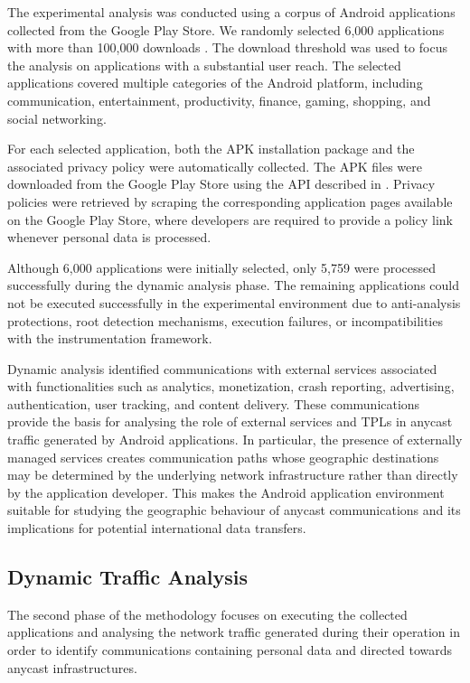 The experimental analysis was conducted using a corpus of Android applications collected from the Google Play Store. We randomly selected 6,000 applications with more than 100,000 downloads \cite{Pascual2025AnycastDisaster}. The download threshold was used to focus the analysis on applications with a substantial user reach. The selected applications covered multiple categories of the Android platform, including communication, entertainment, productivity, finance, gaming, shopping, and social networking.

For each selected application, both the APK installation package and the associated privacy policy were automatically collected. The APK files were downloaded from the Google Play Store using the API described in \cite{Marty0678/googleplay-api:API}. Privacy policies were retrieved by scraping the corresponding application pages available on the Google Play Store, where developers are required to provide a policy link whenever personal data is processed.

Although 6,000 applications were initially selected, only 5,759 were processed successfully during the dynamic analysis phase. The remaining applications could not be executed successfully in the experimental environment due to anti-analysis protections, root detection mechanisms, execution failures, or incompatibilities with the instrumentation framework.

Dynamic analysis identified communications with external services associated with functionalities such as analytics, monetization, crash reporting, advertising, authentication, user tracking, and content delivery. These communications provide the basis for analysing the role of external services and TPLs in anycast traffic generated by Android applications. In particular, the presence of externally managed services creates communication paths whose geographic destinations may be determined by the underlying network infrastructure rather than directly by the application developer. This makes the Android application environment suitable for studying the geographic behaviour of anycast communications and its implications for potential international data transfers.

\subsection{Dynamic Traffic Analysis}
\label{sc:anycast_experiments_traffic_collection}

The second phase of the methodology focuses on executing the collected applications and analysing the network traffic generated during their operation in order to identify communications containing personal data and directed towards anycast infrastructures.

